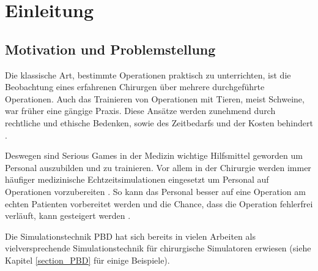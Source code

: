 \chapter{Einleitung}
\label{chap_Einleitung}

\section{Motivation und Problemstellung} %


Die klassische Art, bestimmte Operationen praktisch zu unterrichten, ist die Beobachtung eines erfahrenen Chirurgen über mehrere durchgeführte Operationen. Auch das Trainieren von Operationen mit Tieren, meist Schweine, war früher eine gängige Praxis. Diese Ansätze werden zunehmend durch rechtliche und ethische Bedenken, sowie des Zeitbedarfs und der Kosten behindert \cite{SurgSim}.

Deswegen sind Serious Games in der Medizin wichtige Hilfsmittel geworden um Personal auszubilden und zu trainieren. Vor allem in der Chirurgie werden immer häufiger medizinische Echtzeitsimulationen eingesetzt um Personal auf Operationen vorzubereiten \cite{SimRole}. So kann das Personal besser auf eine Operation am echten Patienten vorbereitet werden und die Chance, dass die Operation fehlerfrei verläuft, kann gesteigert werden \cite{VRNeuro}.

Die Simulationstechnik \ac{PBD} \cite{PBD} hat sich bereits in vielen Arbeiten als vielversprechende Simulationstechnik für chirurgische Simulatoren erwiesen (siehe Kapitel \ref{section_PBD} für einige Beispiele). 

